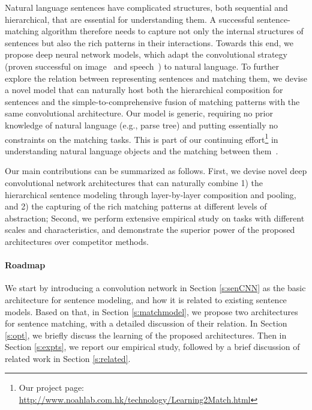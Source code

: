 \documentclass{article} \usepackage{nips14submit_e,times}
\newcommand{\0}{\ensuremath{\mathbf{0}}}
\newcommand{\1}{\ensuremath{\mathbf{1}}}
\begin{document}
Natural language sentences have complicated structures, both sequential and hierarchical, that are essential for understanding them. A successful sentence-matching algorithm therefore needs to capture not only the internal structures of sentences but also the rich patterns in their interactions. Towards this end, we propose deep neural network models, which adapt the convolutional strategy (proven successful on image~\cite{cnn} and speech~\cite{cnn_speech}) to natural language. To further explore the relation between representing sentences and matching them, we devise a novel model that can naturally host both the hierarchical composition for  sentences and the simple-to-comprehensive fusion of matching patterns with the same convolutional architecture. Our model is generic, requiring no prior knowledge of natural language (e.g., parse tree) and putting essentially no constraints on the matching tasks. This is part of our continuing effort\footnote{Our project page: \url{http://www.noahlab.com.hk/technology/Learning2Match.html}} in understanding natural language objects and the matching between them~\cite{nipsmatch, emnlpmatch}.



Our main contributions can be summarized as follows. First, we devise novel deep convolutional network architectures that can naturally combine 1) the hierarchical sentence modeling through layer-by-layer composition and pooling, and 2) the capturing of the rich matching patterns at different levels of abstraction; Second, we perform extensive empirical study on tasks with different scales and characteristics, and demonstrate the superior power of the proposed architectures over competitor methods.


\paragraph{Roadmap} We start by  introducing a convolution network  in Section \ref{s:senCNN} as the basic architecture for sentence modeling, and how it is related to existing sentence models. Based on that, in Section \ref{s:matchmodel}, we propose two architectures for sentence matching, with a detailed discussion of their relation. In Section \ref{s:opt}, we briefly discuss the learning of the proposed architectures. Then in Section \ref{s:expts}, we report our empirical study, followed by a brief discussion of related work in Section \ref{s:related}.


\vspace{-10pt}
\end{document}
